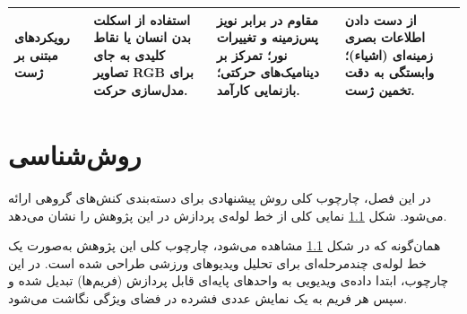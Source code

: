 \documentclass[12pt]{report}
\begin{document}
\begin{table}[t]
\begin{tabularx}{\textwidth}{|X|>{\raggedleft\arraybackslash}p{3.5cm}|X|X|>{\raggedleft\arraybackslash}p{1.5cm}|}
\textbf{رویکردهای مبتنی بر ژست}
& استفاده از اسکلت بدن انسان یا نقاط کلیدی به جای تصاویر RGB برای مدل‌سازی حرکت.
& مقاوم در برابر نویز پس‌زمینه و تغییرات نور؛ تمرکز بر دینامیک‌های حرکتی؛ بازنمایی کارآمد.
& از دست دادن اطلاعات بصری زمینه‌ای (اشیاء)؛ وابستگی به دقت تخمین ژست.
& \cite{fifteen} \\
\hline

\end{tabularx}
\end{table}



\chapter{روش‌شناسی}

در این فصل، چارچوب کلی روش پیشنهادی برای دسته‌بندی کنش‌های گروهی ارائه می‌شود. شکل \ref{fig:pipeline} نمایی کلی از خط لوله‌ی پردازش در این پژوهش را نشان می‌دهد.

\begin{figure}[H]
\centering
{}
\caption{}
\label{fig:pipeline}
\end{figure}

\addtocounter{footnote}{-1} %
\addtocounter{footnote}{1}    %

همان‌گونه که در شکل \ref{fig:pipeline} مشاهده می‌شود، چارچوب کلی این پژوهش به‌صورت یک خط لوله‌ی چندمرحله‌ای برای تحلیل ویدیوهای ورزشی طراحی شده است. در این چارچوب، ابتدا داده‌ی ویدیویی به واحدهای پایه‌ای قابل پردازش (فریم‌ها) تبدیل شده و سپس هر فریم به یک نمایش عددی فشرده در فضای ویژگی نگاشت می‌شود.
\end{document}
